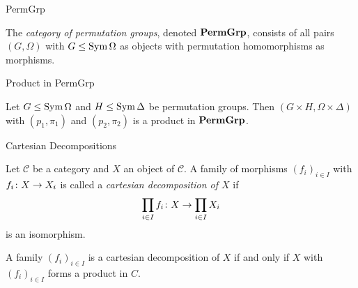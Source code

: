 
\begin{frame}{PermGrp}
    \begin{defn}
        The \emph{category of permutation groups},
        denoted $\mathbf{PermGrp}$,
        consists of all pairs $(G, \Omega)$ with $G \leq \operatorname{Sym} \Omega$ as objects
        with permutation homomorphisms as morphisms.
    \end{defn}
\end{frame}


\begin{frame}{Product in PermGrp}
    \begin{lemma}
        Let $G \leq \operatorname{Sym} \Omega$ and $H \leq \operatorname{Sym} \Delta$ be permutation
        groups.
        Then $(G \times H, \Omega \times \Delta)$ with
        $(p_1, \pi_1)$ and $(p_2, \pi_2)$ is a product in $\mathbf{PermGrp}$.
    \end{lemma}
\end{frame}

\begin{frame}{Cartesian Decompositions}
    \begin{defn}
        Let $\mathcal C$ be a category and $X$ an object of $\mathcal C$.
        A family of morphisms $(f_i)_{i \in I}$ with
        $f_i \colon X \rightarrow X_i$
        is called a
        \emph{cartesian decomposition of $X$}
        if
        \pause
        \[
            \prod_{i \in I} f_i
            \colon
            X
            \rightarrow
            \prod_{i \in I} X_i
        \]
        is an isomorphism.
    \end{defn}
    \pause

    \begin{lemma}
        A family $(f_i)_{i \in I}$ is a cartesian decomposition of $X$
        if and only if
        $X$ with $(f_i)_{i \in I}$ forms a product in $C$.
    \end{lemma}
\end{frame}


